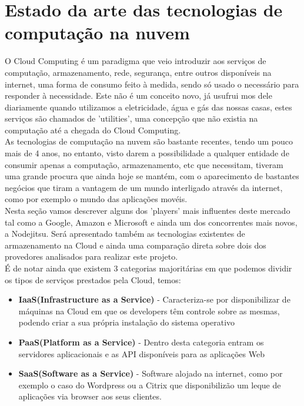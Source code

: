 
\chapter{Estado da arte das tecnologias de computação na nuvem} %
\label{Chapter2} %


O Cloud Computing é um paradigma que veio introduzir aos serviços de computação, armazenamento, rede, segurança, entre outros disponíveis na internet, uma forma de consumo feito à medida, sendo só usado o necessário para responder à necessidade. Este não é um conceito novo, já usufrui mos dele diariamente quando utilizamos a eletricidade, água e gás das nossas casas, estes serviços são chamados de 'utilities', uma concepção que não existia na computação até a chegada do Cloud Computing. \\
As tecnologias de computação na nuvem são bastante recentes, tendo um pouco mais de 4 anos, no entanto, visto darem a possibilidade a qualquer entidade de consumir apenas a computação, armazenamento, etc que necessitam, tiveram uma grande procura que ainda hoje se mantém, com o aparecimento de bastantes negócios que tiram a vantagem de um mundo interligado através da internet, como por exemplo o mundo das aplicações movéis.\\
Nesta seção vamos descrever alguns dos 'players' mais influentes deste mercado tal como a Google, Amazon e Microsoft e ainda um dos concorrentes mais novos, a Nodejitsu. Será apresentado também as tecnologias existentes de armazenamento na Cloud e ainda uma comparação direta sobre dois dos provedores analisados para realizar este projeto.\\
É de notar ainda que existem 3 categorias majoritárias em que podemos dividir os tipos de serviços prestados pela Cloud, temos:\\
\begin{itemize}
\item {\bf IaaS(Infrastructure as a Service)} - Caracteriza-se por disponibilizar de máquinas na Cloud em que os developers têm controle sobre as mesmas, podendo criar a sua própria instalação do sistema operativo
\item {\bf PaaS(Platform as a Service) }- Dentro desta categoria entram os servidores aplicacionais e as API disponíveis para as aplicações Web
\item {\bf SaaS(Software as a Service) }- Software alojado na internet, como por exemplo o caso do Wordpress ou a Citrix que disponibilizão um leque de aplicações via browser aos seus clientes.
\end{itemize}

